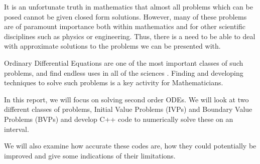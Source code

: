 It is an unfortunate truth in mathematics that almost all problems which can be posed cannot be given closed form solutions. However, many of these problems are of paramount importance both within mathematics and for other scientific disciplines such as physics or engineering. Thus, there is a need to be able to deal with approximate solutions to the problems we can be presented with.

Ordinary Differential Equations are one of the most important classes of such problems, and find endless uses in all of the sciences \cite{odes}. Finding and developing techniques to solve such problems is a key activity for Mathematicians.

In this report, we will focus on solving second order ODEs. We will look at two different classes of problems, Initial Value Problems (IVPs) and Boundary Value Problems (BVPs) \cite{griffiths2010numerical} and develop C++ code to numerically solve these on an interval.

We will also examine how accurate these codes are, how they could potentially be improved and give some indications of their limitations.